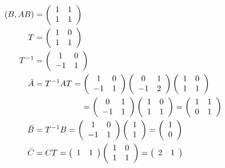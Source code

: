 \documentclass[a4paper,11pt]{jreport}
\begin{document}
\begin{align*}
	(B, AB) 
	& =
	\left (
	\begin{array}{cc}
	 1 & 1\\ 
	 1 & 1
	\end{array}
	\right )
\\
	T
	&=
	\left (
	\begin{array}{cc}
	 1 & 0\\ 
	 1 & 1
	\end{array}
	\right )
\\
	T^{-1}
	&=
	\left (
	\begin{array}{cc}
	 1 & 0\\ 
	 -1 & 1
	\end{array}
	\right )
\\
	\bar{A} 
	&= 
	T^{-1} A T
	=
	\left (
	\begin{array}{cc}
	 1 & 0\\ 
	 -1 & 1
	\end{array}
	\right )
	\left (
	\begin{array}{cc}
	 0 & 1 \\
	 -1 & 2
	\end{array}
	\right )
	\left (
	\begin{array}{cc}
	 1 & 0\\ 
	 1 & 1
	\end{array}
	\right )
\\	
	&	\hspace*{2cm}
	=
	\left (
	\begin{array}{cc}
	 0 & 1 \\
	 -1 & 1
	\end{array}
	\right )
	\left (
	\begin{array}{cc}
	 1 & 0\\ 
	 1 & 1
	\end{array}
	\right )
	=
	\left (
	\begin{array}{cc}
	 1 & 1\\ 
	 0 & 1
	\end{array}
	\right )
\\
	\bar{B}
	&=
	T^{-1}B
	=
	\left (
	\begin{array}{cc}
	 1 & 0\\ 
	 -1 & 1
	\end{array}
	\right )
	\left (
	\begin{array}{c}
	 1 \\ 1 
	\end{array}
	\right )
	=
	\left (
	\begin{array}{c}
	 1 \\ 0
	\end{array}
	\right )
\\
	\bar{C}
	&=
	C T
	=
	\left (
	\begin{array}{cc}
	 1 & 1  
	\end{array}
	\right )
	\left (
	\begin{array}{cc}
	 1 & 0\\ 
	 1 & 1
	\end{array}
	\right )
	=
	\left (
	\begin{array}{cc}
	 2 & 1  
	\end{array}
	\right )
\end{align*}
\end{document}
